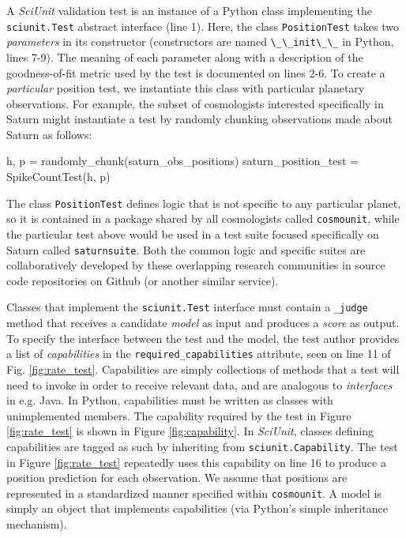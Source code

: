 \documentclass[9pt]{sig-alternate}
\newcommand{\verbx}[1]{\lstinline{#1}}
\begin{document}
A \textit{SciUnit} validation test is an {instance} of a Python class implementing the \verbx{sciunit.Test} abstract interface (line 1). 
Here, the class \verbx{PositionTest} takes two \emph{parameters} in its constructor (constructors are named \verbx{\_\_init\_\_} in Python, lines 7-9). 
The meaning of each parameter along with a description of the goodness-of-fit metric used by the test is documented on lines 2-6. 
To create a \emph{particular} position test, we instantiate this class with particular planetary observations. 
For example, the subset of cosmologists interested specifically in Saturn might instantiate a test by randomly chunking observations made about Saturn as follows:
\begin{python}
  h, p = randomly_chunk(saturn_obs_positions)
  saturn_position_test = SpikeCountTest(h, p)
\end{python}

The class \verb|PositionTest| defines logic that is not specific to any particular planet, so it is contained in a package shared by all cosmologists called \verbx{cosmounit}, while the particular test above would be used in a test suite focused specifically on Saturn called \verbx{saturnsuite}. Both the common logic and specific suites are collaboratively developed by these overlapping research communities in source code repositories on Github (or another similar service).

Classes that implement the \verbx{sciunit.Test} interface must contain a \verbx{_judge} method that receives a candidate \emph{model} as input and produces a \textit{score} as output. 
To specify the interface between the test and the model, the test author provides a list of \emph{capabilities} in the \verbx{required_capabilities} attribute, seen on line 11 of Fig. \ref{fig:rate_test}. 
Capabilities are simply collections of methods that a test will need to invoke in order to receive relevant data, and are analogous to \emph{interfaces} in e.g. Java. 
In Python, capabilities must be written as classes with unimplemented members. 
The capability required by the test in Figure \ref{fig:rate_test} is shown in Figure \ref{fig:capability}. 
In \textit{SciUnit}, classes defining capabilities are tagged as such by inheriting from \verbx{sciunit.Capability}. The test in Figure \ref{fig:rate_test} repeatedly uses this capability on line 16 to produce a position prediction for each observation.  We assume that positions are represented in a standardized manner specified within \verbx{cosmounit}. A model is simply an object that implements capabilities (via Python's simple inheritance mechanism).
\end{document}
